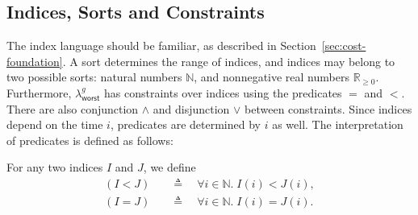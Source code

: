 \subsection{Indices, Sorts and Constraints}
The index language should be familiar, as described in Section~\ref{sec:cost-foundation}. 
A sort determines the range of indices, and indices may belong to two possible sorts: natural numbers $\mathbb{N}$, and 
nonnegative real numbers $\mathbb{R}_{\ge 0}$. Furthermore, $\lambda^g_{\mathsf{worst}}$ has constraints over indices using the 
predicates $=$ and $<$. There are also conjunction $\land$ and disjunction $\lor$ between constraints. 
Since indices depend on the time $i$, predicates are determined by $i$ as well. The interpretation of predicates is defined as follows:
\begin{defn}
\label{def:constraint-entailment}
For any two indices $I$ and $J$, we define
\[
\begin{aligned}
  (I < J)
  &\quad\triangleq\quad
  \forall i \in \mathbb{N}.\; I(i) < J(i),\\
  (I = J)
  &\quad\triangleq\quad
  \forall i \in \mathbb{N}.\; I(i) = J(i).
\end{aligned}
\]
\end{defn}


